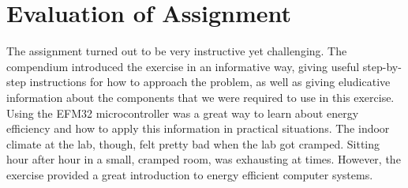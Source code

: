 \section{Evaluation of Assignment}

The assignment turned out to be very instructive yet challenging. The compendium introduced the exercise in an informative way, giving useful step-by-step instructions for how to approach the problem, as well as giving eludicative information about the components that we were required to use in this exercise. Using the EFM32 microcontroller was a great way to learn about energy efficiency and how to apply this information in practical situations. The indoor climate at the lab, though, felt pretty bad when the lab got cramped. Sitting hour after hour in a small, cramped room, was exhausting at times. However, the exercise provided a great introduction to energy efficient computer systems. 
